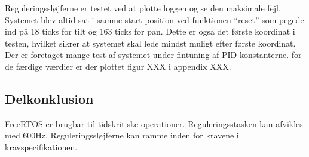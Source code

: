 Reguleringssløjferne er testet ved at plotte loggen og se den maksimale fejl.
Systemet blev altid sat i samme start position ved funktionen ``reset'' som pegede ind på 18 ticks for tilt og 163 ticks for pan.
Dette er også det første koordinat i testen, hvilket sikrer at systemet skal lede mindst muligt efter første koordinat.
Der er foretaget mange test af systemet under fintuning af PID konstanterne.
for de færdige værdier er der plottet figur XXX i appendix XXX.



\subsection{Delkonklusion}
FreeRTOS er brugbar til tidskritiske operationer.
Reguleringsstasken kan afvikles med 600Hz. 
Reguleringssløjferne kan ramme inden for kravene i kravspecifikationen.
